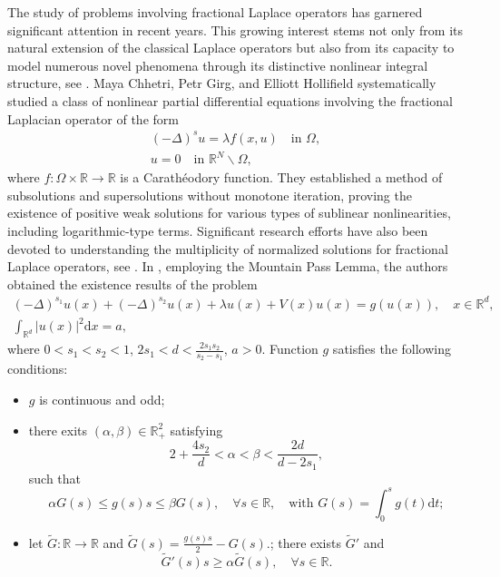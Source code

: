 \documentclass[10pt,a4paper]{amsart}
\numberwithin{equation}{section}
\begin{document}
The study of problems involving fractional Laplace operators has garnered significant attention
in recent years. This growing interest stems not only from its natural extension of the classical
Laplace operators but also from its capacity to model numerous novel phenomena through its distinctive nonlinear integral structure, see \cite{ref7,ref11,ref14}.
Maya Chhetri, Petr Girg, and Elliott Hollifield \cite{ref10} systematically studied a class of
nonlinear partial differential equations involving the fractional Laplacian operator of the form
\begin{gather*}
(-\Delta)^{s}u=\lambda f(x,u)\quad  \text{in }\Omega,\\
u=0  \quad \text{in }\mathbb{R}^N\backslash\Omega,
\end{gather*}
where $f:\Omega\times\mathbb{R}\to\mathbb{R}$ is a Carath\'{e}odory function.
They established a method of subsolutions and supersolutions without monotone iteration,
proving the existence of positive weak solutions for various types of sublinear nonlinearities,
including logarithmic-type terms.
Significant research efforts have also been devoted to understanding the multiplicity of
normalized solutions for fractional Laplace operators, see \cite{ref19, ref20, ref25, ref34}.
In \cite{ref8}, employing the Mountain Pass Lemma,  the authors obtained the  existence
results of  the problem
\begin{gather*}
(-\Delta)^{s_1} u(x)+(-\Delta)^{s_2} u(x)+\lambda u(x)+V(x)u(x)=g(u(x)),\quad
x\in \mathbb{R}^{d},\\
\int_{\mathbb{R}^{d}}|u(x)|^{2}\mathrm{d}x=a,
\end{gather*}
where $0<s_1<s_2<1$, $2s_1<d<\frac{2s_1s_2}{s_2-s_1}$, $a>0$.
Function $g$  satisfies  the following conditions:
\begin{itemize}
\item[(A10)] $g$ is continuous and odd;

\item[(A11)] there exits $(\alpha, \beta)\in\mathbb{R}_{+}^{2}$ satisfying
$$
2+\frac{4s_2}{d}<\alpha<\beta<\frac{2d}{d-2s_1},
$$
such that
$$
\alpha G(s)\le g(s)s\le \beta G(s),\quad\forall s\in\mathbb{R}, \quad\text{with }
G(s)=\int_0^{s}g(t)\mathrm{d}t;
$$
\item[(A12)] let
$\tilde{G}:\mathbb{R}\to\mathbb{R}$ and
$\tilde{G}(s)=\frac{g(s)s}{2}-G(s)$.; there exists $\tilde{G}'$  and
$$
\tilde{G}'(s)s\ge\alpha\tilde{G}(s),\quad\forall s\in\mathbb{R}.
$$
\end{itemize}
\end{document}
